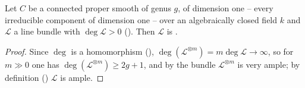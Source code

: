 
\begin{lemma}
\label{lem:pcb-positive-degree-ample}
Let \(C\) be a connected proper smooth 
of genus \(g\), of dimension one -- every irreducible component of
dimension one -- over an algebraically closed field \(k\) and
\(\mathcal L\) a line bundle with \(\deg\mathcal L>0\)
().  Then \(\mathcal L\) is
.
\end{lemma}
\begin{proof}
Since \(\deg\) is a homomorphism (),
\(\deg(\mathcal L^{\otimes m})=m\deg\mathcal L\to\infty\), so for
\(m\gg0\) one has \(\deg(\mathcal L^{\otimes m})\geq2g+1\), and by
 the bundle
\(\mathcal L^{\otimes m}\) is very ample; by definition
() \(\mathcal L\) is ample.
\end{proof}

